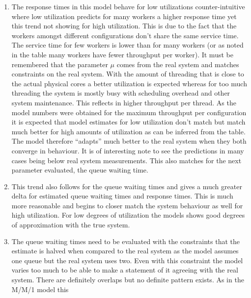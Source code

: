         \begin{enumerate}
            \item The response times in this model behave for low utilizations counter-intuitive where low utilization
                  predicts for many workers a higher response time yet this trend not showing for high utilization. This
                  is due to the fact that the workers amongst different configurations don't share the same service
                  time. The service time for few workers is lower than for many workers (or as noted in the table many
                  workers have fewer throughput per worker). It must be remembered that the parameter $\mu$ comes from
                  the real system and matches constraints on the real system. With the amount of threading that is close
                  to the actual physical cores a better utilization is expected whereas for too much threading the
                  system is mostly busy with scheduling overhead and other system maintenance. This reflects in higher
                  throughput per thread. As the model numbers were obtained for the maximum throughput per configuration
                  it is expected that model estimates for low utilization don't match but match much better for high
                  amounts of utilization as can be inferred from the table. The model therefore ``adapts'' much better
                  to the real system when they both converge in behaviour. It is of interesting note to see the
                  predictions in many cases being below real system measurements. This also matches for the next
                  parameter evaluated, the queue waiting time.
            \item This trend also follows for the queue waiting times and gives a much greater delta for estimated queue
                  waiting times and response times. This is much more reasonable and begins to closer match the system
                  behaviour as well for high utilization. For low degrees of utilization the models shows good degrees
                  of approximation with the true system.
            \item The queue waiting times need to be evaluated with the constraints that the estimate is halved when
                  compared to the real system as the model assumes one queue but the real system uses two. Even with
                  this constraint the model varies too much to be able to make a statement of it agreeing with the real
                  system. There are definitely overlaps but no definite pattern exists. As in the M/M/1 model this

\end{enumerate}

